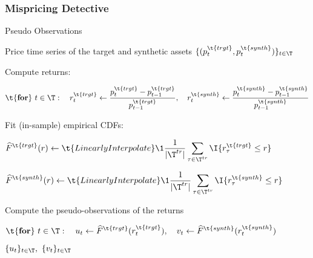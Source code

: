 \subsubsection{Mispricing Detective}

\begin{algorithm}[H]
\label{alg:calibrating_student-t}
\caption{Pseudo Observations}
\begin{algorithmic}[1]
\Require 
Price time series of the target and synthetic assets 
$\{(p^{\t{trgt}}_{t}, p^{\t{synth}}_{t})\}_{t \in \T}$

\mx 
\State Compute returns: 

$\displaystyle
\t{\textbf{for}}~{t\in\T}: \quad 
r_t^{\t{trgt}} \gets \frac{p_t^{\t{trgt}}-p_{t-1}^{\t{trgt}}}{p_{t-1}^{\t{trgt}}}
, \quad 
r_t^{\t{synth}} \gets \frac{p_t^{\t{synth}}-p_{t-1}^{\t{synth}}}{p_{t-1}^{\t{synth}}}
$

\mx 
\State Fit (in-sample) empirical CDFs: 

$\displaystyle
\widehat F^{\t{trgt}}(r) \gets 
\t{LinearlyInterpolate}\1{ \frac{1}{|\T^{tr}|} \sum_{\tau\in \T^{tr}} \I{r^{\t{trgt}}_{\tau} \leq r }}
$

$\displaystyle
\widehat F^{\t{synth}}(r) \gets \t{LinearlyInterpolate}\1{ \frac{1}{|\T^{tr}|} \sum_{\tau \in \T^{tr}} \I{r^{\t{synth}}_{\tau} \leq r }}
$

\mx 
\State Compute the pseudo-observations of the returns

$\displaystyle
\t{\textbf{for}}~{t\in\T}: \quad 
u_t \gets \widehat F^{\t{trgt}}(r^{\t{trgt}}_t)
,\quad 
v_t \gets \widehat F^{\t{synth}}(r^{\t{synth}}_t)
$

\mx 
\Ensure 
$
\{u_t\}_{t\in\T},
~
\{v_t\}_{t\in\T}
$
\end{algorithmic}
\end{algorithm}




